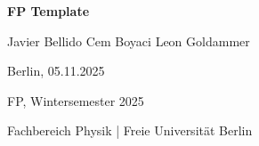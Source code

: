 \documentclass[a4paper,12pt]{article}
\begin{document}
\begin{titlepage}
    \centering
    \vspace*{\fill}

    {\Huge\bfseries FP Template\par}
    \vspace{1cm}

    {\Large Javier Bellido \hspace{0.5cm} Cem Boyaci \hspace{0.5cm} Leon Goldammer\par}
    \vspace{0.5cm}
    {\large Berlin, 05.11.2025\par}
    \vspace{10cm}

    {\large FP, Wintersemester 2025\par}
    {\large Fachbereich Physik | Freie Universität Berlin\par}

    \vspace*{\fill}
\end{titlepage}

\newpage
\tableofcontents
\newpage










\begingroup
{}
\printbibliography
\endgroup
\end{document}
